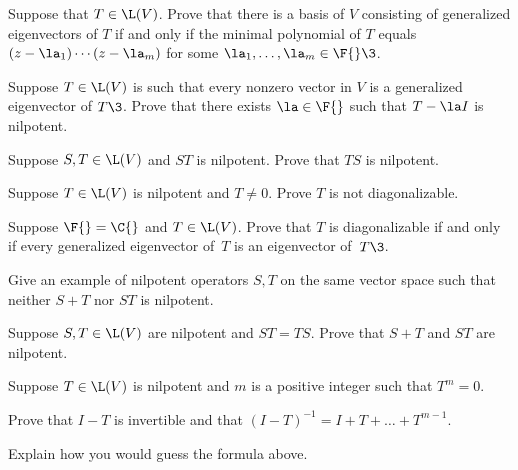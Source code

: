 \exercise
Suppose that $T \in \L(V)$. Prove that there is a basis of $V$ consisting of generalized eigenvectors of $T$ if and only if the minimal polynomial of $T$ equals $(z-\la_1) \cdots (z-\la_m)$ for some
$\la_1, \ldots, \la_m \in \F{}\3$.\label{8geneigb}

\pagebreak[1]


\exercise
Suppose $T \in \L(V)$ is such that every nonzero vector in $V$ is a generalized eigenvector of $T\3$. Prove that there exists $\la \in \F{}$ such that
$T - \la I$ is nilpotent.


\exercise
Suppose $S, T \in \L(V)$ and $ST$ is nilpotent. Prove that $TS$ is nilpotent.


\exercise
Suppose $T \in \L(V)$ is nilpotent and $T \ne 0$. Prove $T$ is not diagonalizable.


\exercise
Suppose $\F{} = \C{}$ and $T \in \L(V)$. Prove that $T$ is diagonalizable if and only if every generalized eigenvector of~$T$ is an eigenvector of~$T\3$.\label{425} 


\exercise
\begin{SUBtheorem}
\item
Give an example of nilpotent operators $S, T$ on the same vector space such that neither $S+T$ nor $ST$ is nilpotent.
\item
Suppose $S, T \in \L(V)$ are nilpotent and $ST = TS$. Prove that $S + T$ and $ST$ are nilpotent.
\end{SUBtheorem}


\exercise
Suppose $T \in \L(V)$ is nilpotent and $m$ is a positive integer such that $T^m = 0$.
\begin{subtheorem}
\item
Prove that $I-T$ is invertible and that
$
(I - T)^{-1} = I + T + \dots + T^{m-1}\!$.
\item
Explain how you would guess the formula above.
\end{subtheorem}
\exercisesubtheoremend


